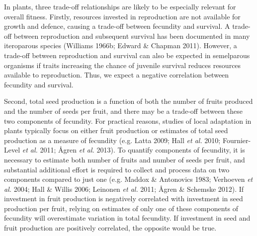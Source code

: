 \documentclass[]{article}
\begin{document}
In plants, three trade-off relationships are likely to be especially relevant for overall fitness. Firstly, resources invested in reproduction are not available for growth and defence, causing a trade-off between fecundity and survival. A trade-off between reproduction and subsequent survival has been documented in many iteroparous species (Williams 1966b; Edward \& Chapman 2011). However, a trade-off between reproduction and survival can also be expected in semelparous organisms if traits increasing the chance of juvenile survival reduces resources available to reproduction. Thus, we expect a negative correlation between fecundity and survival.

Second, total seed production is a function of both the number of fruits produced and the number of seeds per fruit, and there may be a trade-off between these two components of fecundity. For practical reasons, studies of local adaptation in plants typically focus on either fruit production or estimates of total seed production as a measure of fecundity (e.g. Latta 2009; Hall \emph{et al.} 2010; Fournier-Level \emph{et al.} 2011; Ågren \emph{et al.} 2013). To quantify components of fecundity, it is necessary to estimate both number of fruits and number of seeds per fruit, and substantial additional effort is required to collect and process data on two components compared to just one (e.g. Maddox \& Antonovics 1983; Verhoeven \emph{et al.} 2004; Hall \& Willis 2006; Leinonen \emph{et al.} 2011; Ågren \& Schemske 2012). If investment in fruit production is negatively correlated with investment in seed production per fruit, relying on estimates of only one of these components of fecundity will overestimate variation in total fecundity. If investment in seed and fruit production are positively correlated, the opposite would be true.
\end{document}
